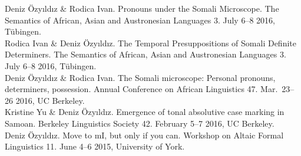\documentclass[11pt, a4paper]{article} %
\newcommand{\years}[1]{\marginnote{\scriptsize #1}} %
\newcommand{\me}{Deniz \"Ozy\i{}ld\i{}z}
\begin{document}
\me{} \& Rodica Ivan. Pronouns under the Somali Microscope. The Semantics of African, Asian and Austronesian Languages 3. July 6--8 2016, T\"ubingen.\\[.25em]
Rodica Ivan \& Deniz \"Ozy\i{}ld\i{}z. The Temporal Presuppositions of Somali Definite Determiners. The Semantics of African, Asian and Austronesian Languages 3. July 6--8 2016, T\"ubingen.\\[.25em]
\years{} \me{} \& Rodica Ivan. {The Somali microscope: Personal pronouns,
determiners, possession}. Annual Conference on African Linguistics 47. Mar.\ 23--26 2016, UC Berkeley.\\[.25em]
Kristine Yu \& Deniz \"Ozy\i{}ld\i{}z. Emergence of tonal absolutive case marking in Samoan. Berkeley Linguistics Society 42. February 5--7 2016, UC Berkeley.\\[.25em]
\years{2015} \me. {Move to mI, but only if you can}. Workshop on Altaic Formal Linguistics 11. June 4--6 2015, University of York.
\end{document}
